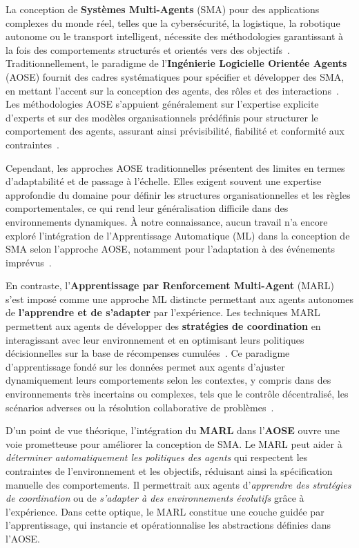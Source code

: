 \documentclass[pdflatex,sn-mathphys-num]{sn-jnl}%
\theoremstyle{thmstyleone}%
\theoremstyle{thmstyletwo}%
\theoremstyle{thmstylethree}%
\begin{document}
La conception de \textbf{Systèmes Multi-Agents} (SMA) pour des applications complexes du monde réel, telles que la cybersécurité, la logistique, la robotique autonome ou le transport intelligent, nécessite des méthodologies garantissant à la fois des comportements structurés et orientés vers des objectifs~\cite{Jamont2O15}. Traditionnellement, le paradigme de l’\textbf{Ingénierie Logicielle Orientée Agents} (AOSE) fournit des cadres systématiques pour spécifier et développer des SMA, en mettant l’accent sur la conception des agents, des rôles et des interactions~\cite{Pavon2003, Bernon2005}. Les méthodologies AOSE s’appuient généralement sur l’expertise explicite d’experts et sur des modèles organisationnels prédéfinis pour structurer le comportement des agents, assurant ainsi prévisibilité, fiabilité et conformité aux contraintes~\cite{Hindriks2014}.

Cependant, les approches AOSE traditionnelles présentent des limites en termes d’adaptabilité et de passage à l’échelle. Elles exigent souvent une expertise approfondie du domaine pour définir les structures organisationnelles et les règles comportementales, ce qui rend leur généralisation difficile dans des environnements dynamiques. À notre connaissance, aucun travail n’a encore exploré l’intégration de l’Apprentissage Automatique (ML) dans la conception de SMA selon l’approche AOSE, notamment pour l’adaptation à des événements imprévus~\cite{Garcia2004}.

En contraste, l’\textbf{Apprentissage par Renforcement Multi-Agent} (MARL) s’est imposé comme une approche ML distincte permettant aux agents autonomes de \textbf{l’apprendre et de s’adapter} par l’expérience. Les techniques MARL permettent aux agents de développer des \textbf{stratégies de coordination} en interagissant avec leur environnement et en optimisant leurs politiques décisionnelles sur la base de récompenses cumulées~\cite{Zhang2021}. Ce paradigme d’apprentissage fondé sur les données permet aux agents d’ajuster dynamiquement leurs comportements selon les contextes, y compris dans des environnements très incertains ou complexes, tels que le contrôle décentralisé, les scénarios adverses ou la résolution collaborative de problèmes~\cite{Papoudakis2021}.

D’un point de vue théorique, l’intégration du \textbf{MARL} dans l’\textbf{AOSE} ouvre une voie prometteuse pour améliorer la conception de SMA. Le MARL peut aider à \textit{déterminer automatiquement les politiques des agents} qui respectent les contraintes de l’environnement et les objectifs, réduisant ainsi la spécification manuelle des comportements. Il permettrait aux agents d’\textit{apprendre des stratégies de coordination} ou de \textit{s’adapter à des environnements évolutifs} grâce à l’expérience. Dans cette optique, le MARL constitue une couche guidée par l’apprentissage, qui instancie et opérationnalise les abstractions définies dans l’AOSE.
\end{document}
